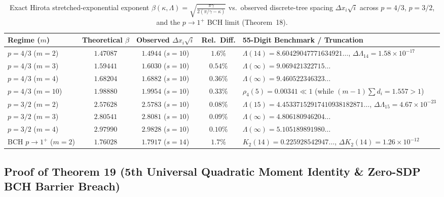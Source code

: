 \documentclass[10pt,letterpaper]{article}
\begin{document}
\begin{table}[htbp]
\centering
\caption{\small Exact Hirota stretched-exponential exponent $\beta(\kappa, \Lambda) = \sqrt{\frac{\pi\gamma}{2(\pi/\gamma-\kappa)}}$ vs.\ observed discrete-tree spacing $\Delta x_i\sqrt{i}$ across $p = 4/3$, $p = 3/2$, and the $p \to 1^+$ BCH limit (Theorem~18).}
\vspace{3pt}
\footnotesize
\setlength{\tabcolsep}{4.5pt}
\begin{tabular}{@{}l c c c l@{}}
\toprule
\textbf{Regime ($m$)} & \textbf{Theoretical $\beta$} & \textbf{Observed $\Delta x_i\sqrt{i}$} & \textbf{Rel.\ Diff.} & \textbf{55-Digit Benchmark / Truncation} \\
\midrule
$p = 4/3$ ($m = 2$) & $1.47087$ & $1.4944$ ($s=10$) & $1.6\%$ & $\Lambda(14) = 8.60429047771634921\dots$, $\Delta\Lambda_{14} = 1.58\times 10^{-17}$ \\
$p = 4/3$ ($m = 3$) & $1.59441$ & $1.6030$ ($s=10$) & $0.54\%$ & $\Lambda(\infty) = 9.069421322715\dots$ \\
$p = 4/3$ ($m = 4$) & $1.68204$ & $1.6882$ ($s=10$) & $0.36\%$ & $\Lambda(\infty) = 9.460522346323\dots$ \\
$p = 4/3$ ($m = 10$)& $1.98880$ & $1.9954$ ($s=10$) & $0.33\%$ & $\rho_4(5) = 0.00341 \ll 1$ (while $(m-1)\sum d_i = 1.557 > 1$) \\
$p = 3/2$ ($m = 2$) & $2.57628$ & $2.5783$ ($s=10$) & $0.08\%$ & $\Lambda(15) = 4.45337152917410938182871\dots$, $\Delta\Lambda_{15} = 4.67\times 10^{-23}$ \\
$p = 3/2$ ($m = 3$) & $2.80541$ & $2.8081$ ($s=10$) & $0.09\%$ & $\Lambda(\infty) = 4.806180946204\dots$ \\
$p = 3/2$ ($m = 4$) & $2.97990$ & $2.9828$ ($s=10$) & $0.10\%$ & $\Lambda(\infty) = 5.105189891980\dots$ \\
BCH $p\to 1^+$ ($m=2$) & $1.76028$ & $1.7917$ ($s=14$) & $1.7\%$ & $K_2(14) = 0.225928542947\dots$, $\Delta K_2(14) = 1.26\times 10^{-12}$ \\
\bottomrule
\end{tabular}
\label{tab:hirota}
\end{table}

\subsection{Proof of Theorem 19 (5th Universal Quadratic Moment Identity \& Zero-SDP BCH Barrier Breach)}
\end{document}
